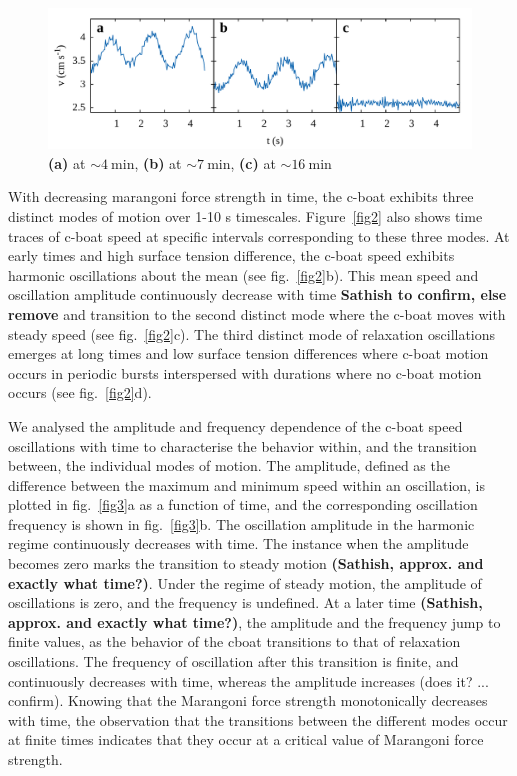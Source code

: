 \documentclass[journal=langd5, manuscript=article, layout=twocolumn]{achemso}
\begin{document}
\begin{figure}[ht]
	\centering
	\includegraphics[width=\textwidth]{uvst_72dypcm.pdf}
	\caption{{\bf (a)} at $\sim 4\ \mathrm{min}$, {\bf (b)} at $\sim 7\ \mathrm{min}$, {\bf (c)} at $\sim 16\ \mathrm{min}$}
\label{fig:uvst_72dypcm}
\end{figure}

With decreasing marangoni force strength in time, the c-boat exhibits three distinct modes of motion over 1-10 s timescales.  Figure~\ref{fig2} also shows time traces of c-boat speed at specific intervals corresponding to these three modes. At early times and high surface tension difference, the c-boat speed exhibits harmonic oscillations about the mean (see fig.~\ref{fig2}b). This mean speed and oscillation amplitude continuously decrease with time {\bf Sathish to confirm, else remove} and transition to the second distinct mode where the c-boat moves with steady speed (see fig.~\ref{fig2}c). The third distinct mode of relaxation oscillations emerges at long times and low surface tension differences where c-boat motion occurs in periodic bursts interspersed with durations where no c-boat motion occurs (see fig.~\ref{fig2}d).

We analysed the amplitude and frequency dependence of the c-boat speed oscillations with time to characterise the behavior within, and the transition between, the individual modes of motion. The amplitude, defined as the difference between the maximum and minimum speed within an oscillation, is plotted in fig.~\ref{fig3}a as a function of time, and the corresponding oscillation frequency is shown in fig.~\ref{fig3}b. The oscillation amplitude in the harmonic regime continuously decreases with time. The instance when the amplitude becomes zero marks the transition to steady motion {\bf (Sathish, approx. and exactly what time?)}. Under the regime of steady motion, the amplitude of oscillations is zero, and the frequency is undefined. At a later time {\bf (Sathish, approx. and exactly what time?)}, the amplitude and the frequency jump to finite values, as the behavior of the cboat transitions to that of relaxation oscillations. The frequency of oscillation after this transition is finite, and continuously decreases with time, whereas the amplitude increases (does it? ... confirm).  Knowing that the Marangoni force strength monotonically decreases with time, the observation that the transitions between the different modes occur at finite times indicates that they occur at a critical value of Marangoni force strength. 
\end{document}
